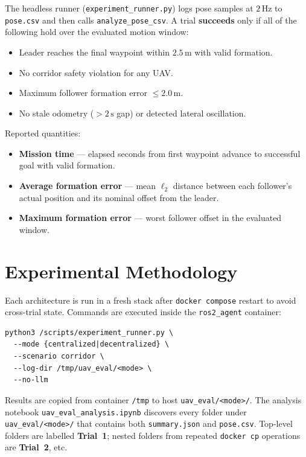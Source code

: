 \documentclass[a4paper,11pt]{article}
\begin{document}
The headless runner (\texttt{experiment\_runner.py}) logs pose samples at $2\,\mathrm{Hz}$ to \texttt{pose.csv} and then calls \texttt{analyze\_pose\_csv}. A trial \textbf{succeeds} only if all of the following hold over the evaluated motion window:
\begin{itemize}
  \item Leader reaches the final waypoint within $2.5\,\mathrm{m}$ with valid formation.
  \item No corridor safety violation for any UAV.
  \item Maximum follower formation error $\le 2.0\,\mathrm{m}$.
  \item No stale odometry ($> 2\,\mathrm{s}$ gap) or detected lateral oscillation.
\end{itemize}

Reported quantities:
\begin{itemize}
  \item \textbf{Mission time} --- elapsed seconds from first waypoint advance to successful goal with valid formation.
  \item \textbf{Average formation error} --- mean $\ell_2$ distance between each follower's actual position and its nominal offset from the leader.
  \item \textbf{Maximum formation error} --- worst follower offset in the evaluated window.
\end{itemize}

\section{Experimental Methodology}

Each architecture is run in a fresh stack after \texttt{docker compose} restart to avoid cross-trial state. Commands are executed inside the \texttt{ros2\_agent} container:

\begin{verbatim}
python3 /scripts/experiment_runner.py \
  --mode {centralized|decentralized} \
  --scenario corridor \
  --log-dir /tmp/uav_eval/<mode> \
  --no-llm
\end{verbatim}

Results are copied from container \texttt{/tmp} to host \texttt{uav\_eval/<mode>/}. The analysis notebook \texttt{uav\_eval\_analysis.ipynb} discovers every folder under \texttt{uav\_eval/<mode>/} that contains both \texttt{summary.json} and \texttt{pose.csv}. Top-level folders are labelled \textbf{Trial~1}; nested folders from repeated \texttt{docker cp} operations are \textbf{Trial~2}, etc.
\end{document}
